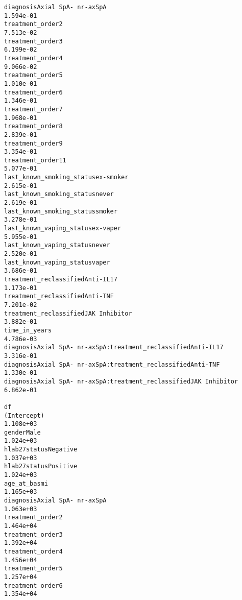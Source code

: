 \documentclass[
  letterpaper,
  DIV=11,
  numbers=noendperiod]{scrartcl}
\begin{document}
\begin{verbatim}
diagnosisAxial SpA- nr-axSpA                                      1.594e-01
treatment_order2                                                  7.513e-02
treatment_order3                                                  6.199e-02
treatment_order4                                                  9.066e-02
treatment_order5                                                  1.010e-01
treatment_order6                                                  1.346e-01
treatment_order7                                                  1.968e-01
treatment_order8                                                  2.839e-01
treatment_order9                                                  3.354e-01
treatment_order11                                                 5.077e-01
last_known_smoking_statusex-smoker                                2.615e-01
last_known_smoking_statusnever                                    2.619e-01
last_known_smoking_statussmoker                                   3.278e-01
last_known_vaping_statusex-vaper                                  5.955e-01
last_known_vaping_statusnever                                     2.520e-01
last_known_vaping_statusvaper                                     3.686e-01
treatment_reclassifiedAnti-IL17                                   1.173e-01
treatment_reclassifiedAnti-TNF                                    7.201e-02
treatment_reclassifiedJAK Inhibitor                               3.882e-01
time_in_years                                                     4.786e-03
diagnosisAxial SpA- nr-axSpA:treatment_reclassifiedAnti-IL17      3.316e-01
diagnosisAxial SpA- nr-axSpA:treatment_reclassifiedAnti-TNF       1.330e-01
diagnosisAxial SpA- nr-axSpA:treatment_reclassifiedJAK Inhibitor  6.862e-01
                                                                         df
(Intercept)                                                       1.108e+03
genderMale                                                        1.024e+03
hlab27statusNegative                                              1.037e+03
hlab27statusPositive                                              1.024e+03
age_at_basmi                                                      1.165e+03
diagnosisAxial SpA- nr-axSpA                                      1.063e+03
treatment_order2                                                  1.464e+04
treatment_order3                                                  1.392e+04
treatment_order4                                                  1.456e+04
treatment_order5                                                  1.257e+04
treatment_order6                                                  1.354e+04

\end{verbatim}
\end{document}
